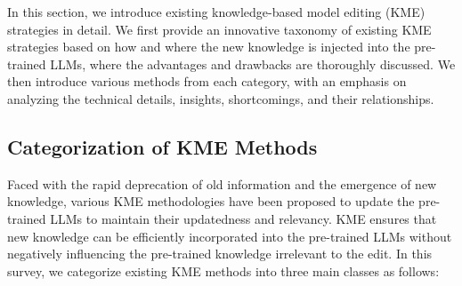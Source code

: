 \documentclass[acmsmall, screen]{acmart}
\begin{document}
In this section, we introduce existing knowledge-based model editing (KME) strategies in detail. We first provide an innovative taxonomy of existing KME strategies based on how and where the new knowledge is injected into the pre-trained LLMs, where the advantages and drawbacks are thoroughly discussed. We then introduce various methods from each category, with an emphasis on analyzing the technical details, insights, shortcomings, and their relationships.

\subsection{Categorization of KME Methods}
\label{sec:category}

Faced with the rapid deprecation of old information and the emergence of new knowledge,  various KME methodologies have been proposed to update the pre-trained LLMs to maintain their updatedness and relevancy. KME ensures that new knowledge can be efficiently incorporated into the pre-trained LLMs without negatively influencing the pre-trained knowledge irrelevant to the edit. In this survey, we categorize existing KME methods into three main classes as follows:
\end{document}
